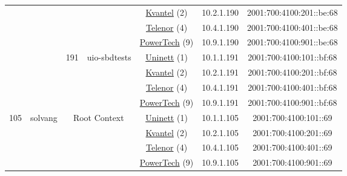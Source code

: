 \begin{small}
\begin{center}
\begin{longtable}{|c|c|c|c|c|c|c|c|}
  &  &  &  & \multicolumn{2}{|c|}{\tiny{\href{http://kvantel.no}{Kvantel} (2)}} & \tiny{10.2.1.190} & \tiny{2001:700:4100:201::be:68} \\* \cline{5-5}\cline{6-6}\cline{7-7}\cline{8-8}
  &  &  &  & \multicolumn{2}{|c|}{\tiny{\href{https://www.telenor.no}{Telenor} (4)}} & \tiny{10.4.1.190} & \tiny{2001:700:4100:401::be:68} \\* \cline{5-5}\cline{6-6}\cline{7-7}\cline{8-8}
  &  &  &  & \multicolumn{2}{|c|}{\tiny{\href{http://www.powertech.no}{PowerTech} (9)}} & \tiny{10.9.1.190} & \tiny{2001:700:4100:901::be:68} \\* \cline{3-3}\cline{4-4}\cline{5-5}\cline{6-6}\cline{7-7}\cline{8-8}
  &  & \multirow{4}{*}{\tiny{191}} & \multicolumn{1}{|l|}{\multirow{4}{*}{\tiny{uio-sbdtests}}} & \multicolumn{2}{|c|}{\tiny{\href{https://www.uninett.no}{Uninett} (1)}} & \tiny{10.1.1.191} & \tiny{2001:700:4100:101::bf:68} \\* \cline{5-5}\cline{6-6}\cline{7-7}\cline{8-8}
  &  &  &  & \multicolumn{2}{|c|}{\tiny{\href{http://kvantel.no}{Kvantel} (2)}} & \tiny{10.2.1.191} & \tiny{2001:700:4100:201::bf:68} \\* \cline{5-5}\cline{6-6}\cline{7-7}\cline{8-8}
  &  &  &  & \multicolumn{2}{|c|}{\tiny{\href{https://www.telenor.no}{Telenor} (4)}} & \tiny{10.4.1.191} & \tiny{2001:700:4100:401::bf:68} \\* \cline{5-5}\cline{6-6}\cline{7-7}\cline{8-8}
  &  &  &  & \multicolumn{2}{|c|}{\tiny{\href{http://www.powertech.no}{PowerTech} (9)}} & \tiny{10.9.1.191} & \tiny{2001:700:4100:901::bf:68} \\ \hline
 \multirow{40}{*}{\tiny{105}} & \multicolumn{1}{|l|}{\multirow{40}{*}{\tiny{solvang}}} & \multicolumn{2}{|c|}{\multirow{4}{*}{\tiny{Root Context}}} & \multicolumn{2}{|c|}{\tiny{\href{https://www.uninett.no}{Uninett} (1)}} & \tiny{10.1.1.105} & \tiny{2001:700:4100:101::69} \\* \cline{5-5}\cline{6-6}\cline{7-7}\cline{8-8}
  &  & \multicolumn{2}{|c|}{} & \multicolumn{2}{|c|}{\tiny{\href{http://kvantel.no}{Kvantel} (2)}} & \tiny{10.2.1.105} & \tiny{2001:700:4100:201::69} \\* \cline{5-5}\cline{6-6}\cline{7-7}\cline{8-8}
  &  & \multicolumn{2}{|c|}{} & \multicolumn{2}{|c|}{\tiny{\href{https://www.telenor.no}{Telenor} (4)}} & \tiny{10.4.1.105} & \tiny{2001:700:4100:401::69} \\* \cline{5-5}\cline{6-6}\cline{7-7}\cline{8-8}
  &  & \multicolumn{2}{|c|}{} & \multicolumn{2}{|c|}{\tiny{\href{http://www.powertech.no}{PowerTech} (9)}} & \tiny{10.9.1.105} & \tiny{2001:700:4100:901::69} \\* \cline{3-3}\cline{4-4}\cline{5-5}\cline{6-6}\cline{7-7}\cline{8-8}

\end{longtable}
\end{center}
\end{small}
